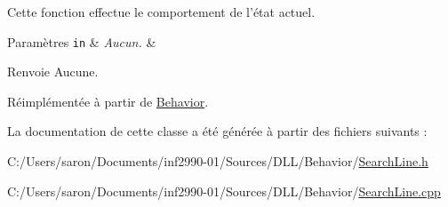 Cette fonction effectue le comportement de l'état actuel.


\begin{DoxyParams}[1]{Paramètres}
\mbox{\tt in}  & {\em Aucun.} & \\
\hline
\end{DoxyParams}
\begin{DoxyReturn}{Renvoie}
Aucune. 
\end{DoxyReturn}


Réimplémentée à partir de \hyperlink{group__inf2990_gac22f205bc85075ff707ad1f695c18439}{Behavior}.



La documentation de cette classe a été générée à partir des fichiers suivants \-:\begin{DoxyCompactItemize}
\item 
C\-:/\-Users/saron/\-Documents/inf2990-\/01/\-Sources/\-D\-L\-L/\-Behavior/\hyperlink{_search_line_8h}{Search\-Line.\-h}\item 
C\-:/\-Users/saron/\-Documents/inf2990-\/01/\-Sources/\-D\-L\-L/\-Behavior/\hyperlink{_search_line_8cpp}{Search\-Line.\-cpp}\end{DoxyCompactItemize}
